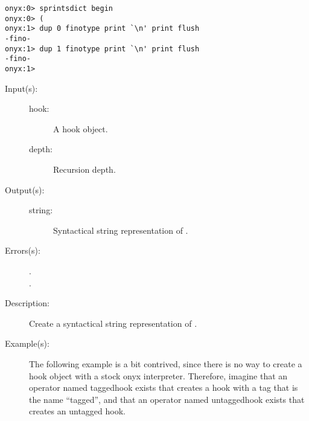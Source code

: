 \begin{description}
\begin{description}
\begin{verbatim}
onyx:0> sprintsdict begin
onyx:0> (
onyx:1> dup 0 finotype print `\n' print flush
-fino-
onyx:1> dup 1 finotype print `\n' print flush
-fino-
onyx:1>
		\end{verbatim}
	\end{description}
\label{sprintsdict:hooktype}
\item[{\onyxop{hook depth}{hooktype}{string}}: ]
	\begin{description}\item[]
	\item[Input(s): ]
		\begin{description}\item[]
		\item[hook: ]
			A hook object.
		\item[depth: ]
			Recursion depth.
		\end{description}
	\item[Output(s): ]
		\begin{description}\item[]
		\item[string: ]
			Syntactical string representation of .
		\end{description}
	\item[Errors(s): ]
		\begin{description}\item[]
		\item[.]
		\item[.]
		\end{description}
	\item[Description: ]
		Create a syntactical string representation of .
	\item[Example(s): ]
		The following example is a bit contrived, since there is no way
		to create a hook object with a stock onyx interpreter.
		Therefore, imagine that an operator named taggedhook exists that
		creates a hook with a tag that is the name ``tagged'', and that
		an operator named untaggedhook exists that creates an untagged
		hook.
		\begin{verbatim}


\end{verbatim}
\end{description}
\end{description}
